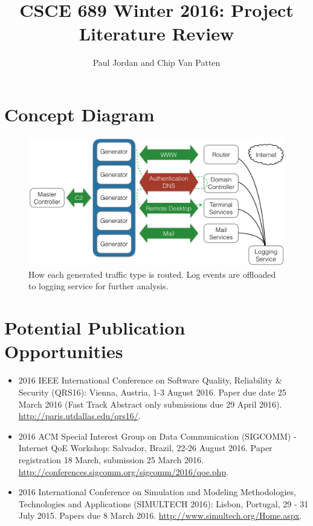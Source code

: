 \documentclass[11pt]{article}
\title{CSCE 689 Winter 2016: Project Literature Review}
\author{Paul Jordan and Chip Van Patten}
\begin{document}
\maketitle
\section{Concept Diagram} 
\begin{figure}[H]
  \centering
  \includegraphics[width=6in]{ConceptDiagram}
  \caption[Concept Diagram]{How each generated traffic type is routed.  Log events are offloaded to logging service for
  further analysis.}
  \label{fig:conceptDiagram}
\end{figure}


\section{Potential Publication Opportunities} 
\begin{itemize}
\item{2016 IEEE International Conference on Software Quality, Reliability \&
Security (QRS16): Vienna, Austria, 1-3 August 2016.  Paper due date 25 March 2016
(Fast Track Abstract only submissions due 29 April 2016).
\url{http://paris.utdallas.edu/qrs16/}.}
\item{2016 ACM Special Interest Group on Data Communication (SIGCOMM) -
Internet QoE Workshop: Salvador, Brazil, 22-26 August 2016.  Paper registration
18 March, submission 25 March 2016.
\url{http://conferences.sigcomm.org/sigcomm/2016/qoe.php}.}
\item{2016 International Conference on Simulation and Modeling Methodologies,
Technologies and Applications (SIMULTECH 2016): Lisbon, Portugal, 29 - 31 July 2015.
Papers due 8 March 2016. \url{http://www.simultech.org/Home.aspx}.}
\end{itemize}
\end{document}
